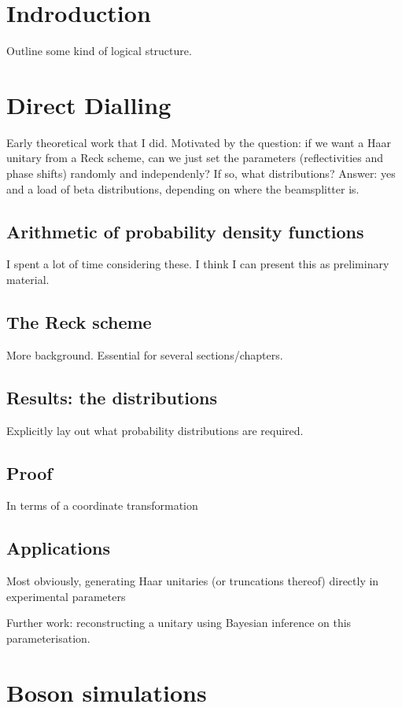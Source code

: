 \documentclass[11pt,a4paper,twoside]{report}
\begin{document}
\chapter{Indroduction}

Outline some kind of logical structure.

\chapter{Direct Dialling}

Early theoretical work that I did. Motivated by the question: if we want a Haar
unitary from a Reck scheme\cite{reck94}, can we just set the parameters
(reflectivities and phase shifts) randomly and independenly? If so, what
distributions? Answer: yes and a load of beta distributions, depending on where
the beamsplitter is.

\section{Arithmetic of probability density functions}
I spent a lot of time considering these. I think I can present this as
preliminary material.

\section{The Reck scheme}
More background. Essential for several sections/chapters.

\section{Results: the distributions}
Explicitly lay out what probability distributions are required.

\section{Proof}
In terms of a coordinate transformation

\section{Applications}
Most obviously, generating Haar unitaries (or truncations thereof) directly in
experimental parameters

Further work: reconstructing a unitary using Bayesian inference on this
parameterisation.

\chapter{Boson simulations}
\end{document}
